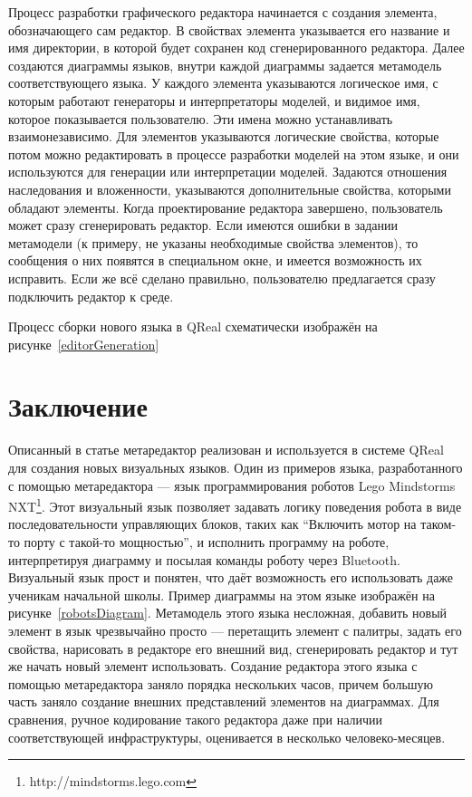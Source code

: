 \documentclass[a4paper]{article}
\begin{document}
Процесс разработки графического редактора начинается с создания элемента, обозначающего сам редактор. В свойствах элемента указывается его название и имя директории, в которой будет сохранен код сгенерированного редактора. Далее создаются диаграммы языков, внутри каждой диаграммы задается метамодель соответствующего языка. У каждого элемента указываются логическое имя, с которым работают генераторы и интерпретаторы моделей, и видимое имя, которое показывается пользователю. Эти имена можно устанавливать взаимонезависимо. Для элементов указываются логические свойства, которые потом можно редактировать в процессе разработки моделей на этом языке, и они используются для генерации или интерпретации моделей. Задаются отношения наследования и вложенности, указываются дополнительные свойства, которыми обладают элементы. Когда проектирование редактора завершено, пользователь может сразу сгенерировать редактор. Если имеются ошибки в задании метамодели (к примеру, не указаны необходимые свойства элементов), то сообщения о них появятся в специальном окне, и имеется возможность их исправить. Если же всё сделано правильно, пользователю предлагается сразу подключить редактор к среде.  

Процесс сборки нового языка в QReal схематически изображён на рисунке~\ref{editorGeneration}

\section{Заключение}
Описанный в статье метаредактор реализован и используется в системе QReal для создания новых визуальных языков. Один из примеров языка, разработанного с помощью метаредактора --- язык программирования роботов Lego Mindstorms NXT\footnote{http://mindstorms.lego.com}. Этот визуальный язык позволяет задавать логику поведения робота в виде последовательности управляющих блоков, таких как ``Включить мотор на таком-то порту с такой-то мощностью'', и исполнить программу на роботе, интерпретируя диаграмму и посылая команды роботу через Bluetooth. Визуальный язык прост и понятен, что даёт возможность его использовать даже ученикам начальной школы. Пример диаграммы на этом языке изображён на рисунке~\ref{robotsDiagram}. Метамодель этого языка несложная, добавить новый элемент в язык чрезвычайно просто --- перетащить элемент с палитры, задать его свойства, нарисовать в редакторе его внешний вид, сгенерировать редактор и тут же начать новый элемент использовать. Создание редактора этого языка с помощью метаредактора заняло порядка нескольких часов, причем большую часть заняло создание внешних представлений элементов на диаграммах. Для сравнения, ручное кодирование такого редактора даже при наличии соответствующей инфраструктуры, оценивается в несколько человеко-месяцев.
\end{document}
